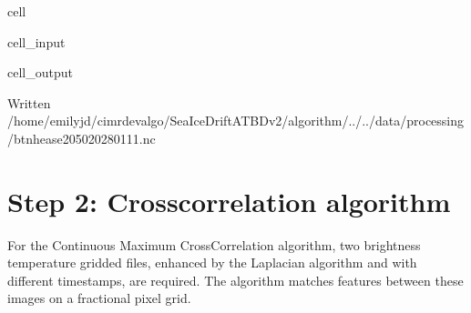\documentclass[letterpaper,10pt,english]{jupyterBook}
\begin{document}
\begin{sphinxuseclass}{cell}
\begin{sphinxVerbatimInput}
\begin{sphinxuseclass}{cell_input}
\begin{sphinxVerbatim}[commandchars=\\\{\}]
    
  
\end{sphinxVerbatim}

\end{sphinxuseclass}\end{sphinxVerbatimInput}
\begin{sphinxVerbatimOutput}

\begin{sphinxuseclass}{cell_output}
\begin{sphinxVerbatim}[commandchars=\\\{\}]
Written /home/emilyjd/cimr\PYGZhy{}devalgo/SeaIceDrift\PYGZus{}ATBD\PYGZus{}v2/algorithm/../../data/processing/bt\PYGZus{}nh\PYGZhy{}ease2\PYGZhy{}050\PYGZus{}20280111.nc
\end{sphinxVerbatim}

\end{sphinxuseclass}\end{sphinxVerbatimOutput}

\end{sphinxuseclass}

\section{Step 2: Cross\sphinxhyphen{}correlation algorithm}
\label{\detokenize{CIMR_L2_Sea_Ice_Drift_algorithm:step-2-cross-correlation-algorithm}}
\sphinxAtStartPar
For the Continuous Maximum Cross\sphinxhyphen{}Correlation algorithm, two brightness temperature gridded files, enhanced by the Laplacian algorithm and with different timestamps, are required. The algorithm matches features between these images on a fractional pixel grid.
\end{document}
